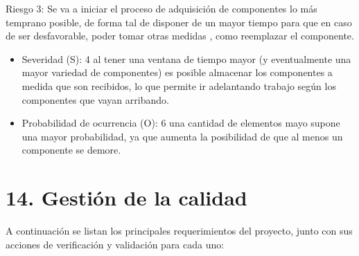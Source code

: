\documentclass[
11pt, %
codirector, %
]{charter}
\begin{document}
Riesgo 3: Se va a iniciar el proceso de adquisición de componentes lo más temprano posible, de forma tal de disponer de un mayor tiempo para que en caso de ser desfavorable, poder tomar otras medidas , como reemplazar el componente.
\begin{itemize}
    \item Severidad (S): 4 al tener una ventana de tiempo mayor (y eventualmente una mayor variedad de componentes) es posible almacenar los componentes a medida que son recibidos, lo que permite ir adelantando trabajo según los componentes que vayan arribando.
    \item  Probabilidad de ocurrencia (O): 6 una cantidad de elementos mayo supone una mayor probabilidad, ya que aumenta la posibilidad de que al menos un componente se demore.

\end{itemize}



\section{14. Gestión de la calidad}
\label{sec:calidad}


A continuación  se listan los principales requerimientos del proyecto, junto con sus acciones de verificación y validación para cada uno:
\end{document}

